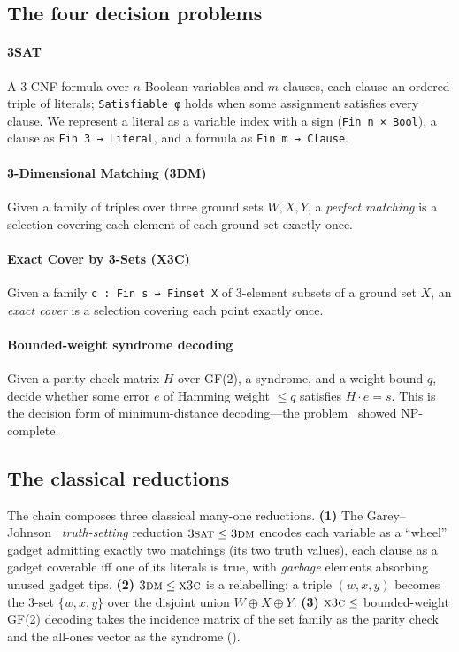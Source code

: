 \documentclass[sigplan,review,anonymous]{acmart}
\begin{document}
\subsection{The four decision problems}\label{sec:problems}

\paragraph{3SAT} A 3-CNF formula over $n$ Boolean variables and $m$ clauses, each clause an ordered triple of
literals; \lstinline{Satisfiable φ} holds when some assignment satisfies every clause. We represent a literal
as a variable index with a sign (\lstinline{Fin n × Bool}), a clause as \lstinline{Fin 3 → Literal}, and a
formula as \lstinline{Fin m → Clause}.

\paragraph{3-Dimensional Matching (3DM)} Given a family of triples over three ground sets $W, X, Y$, a
\emph{perfect matching} is a selection covering each element of each ground set exactly once.

\paragraph{Exact Cover by 3-Sets (X3C)} Given a family \lstinline{c : Fin s → Finset X} of 3-element subsets
of a ground set $X$, an \emph{exact cover} is a selection covering each point exactly once.

\paragraph{Bounded-weight syndrome decoding} Given a parity-check matrix $H$ over GF(2), a syndrome, and a
weight bound $q$, decide whether some error $e$ of Hamming weight $\le q$ satisfies $H \cdot e = s$. This is the
decision form of minimum-distance decoding---the problem~\cite{BMvT78} showed NP-complete.

\subsection{The classical reductions}\label{sec:classical}

The chain composes three classical many-one reductions. \textbf{(1)} The Garey--Johnson~\cite{GJ79}
\emph{truth-setting} reduction $\textsc{3sat} \le \textsc{3dm}$ encodes each variable as a ``wheel'' gadget
admitting exactly two matchings (its two truth values), each clause as a gadget coverable iff one of its
literals is true, with \emph{garbage} elements absorbing unused gadget tips. \textbf{(2)}
$\textsc{3dm} \le \textsc{x3c}$ is a relabelling: a triple $(w,x,y)$ becomes the 3-set $\{w,x,y\}$ over the
disjoint union $W \oplus X \oplus Y$. \textbf{(3)} $\textsc{x3c} \le$ bounded-weight GF(2) decoding takes the
incidence matrix of the set family as the parity check and the all-ones vector as the syndrome
().
\end{document}
